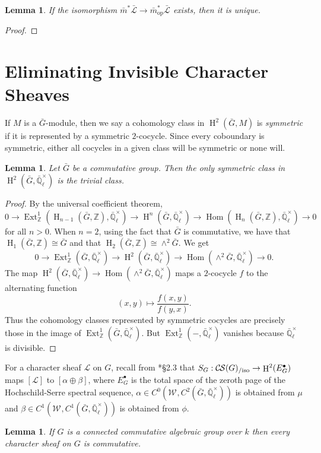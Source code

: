 \documentclass[10pt]{amsart}
\theoremstyle{plain}
\newtheorem{lemma}[theorem]{Lemma}
\theoremstyle{definition}
\newcommand{\ZZ}{{\mathbb{Z}}}
\newcommand{\EE}{\mathbb{\bar Q}_\ell}
\newcommand{\Fq}{k}
\newcommand{\EEx}{\EE^\times}
\newcommand{\Weil}[1]{\mathcal{W}_{#1}}
\DeclareMathOperator{\Hom}{Hom}
\DeclareMathOperator{\Ext}{Ext}
\DeclareMathOperator{\Hh}{H}
\newcommand{\op}{_{\operatorname{op}}}
\newcommand{\cs}[1]{{\mathcal{#1}}}
\newcommand{\gcs}[1]{{\mathcal{\bar #1}}}
\newcommand{\CS}{{\mathcal{C\hskip-0.8pt S}}}
\newcommand{\CSiso}[1]{\CS(#1)_{/\text{iso}}}
\newcommand{\bG}{\bar{G}}
\begin{document}
\begin{lemma}
If the isomorphism ${\bar m}^* \gcs{L} \to {\bar m}\op^* \gcs{L}$ exists, then it is unique.
\end{lemma}
\begin{proof}
\end{proof}

\section{Eliminating Invisible Character Sheaves}

If $M$ is a $\bG$-module, then we say a cohomology class in $\Hh^2(\bG, M)$ is \emph{symmetric} if it is represented
by a symmetric $2$-cocycle.  Since every coboundary is symmetric, either all cocycles in a given class will be symmetric
or none will.

\begin{lemma} \label{lem:symtriv}
Let $\bG$ be a commutative group.  Then the only symmetric class in $\Hh^2(\bG, \EEx)$ is the trivial class.
\end{lemma}

\begin{proof}
By the universal coefficient theorem,
\[
0 \to \Ext^1_\ZZ(\Hh_{n-1}(\bG, \ZZ), \EEx) \to \Hh^n(\bG, \EEx) \to \Hom(\Hh_n(\bG, \ZZ), \EEx) \to 0
\]
for all $n > 0$.  When $n = 2$, using the fact that $\bG$ is commutative, we have that $\Hh_1(\bG, \ZZ) \cong \bG$
and that $\Hh_2(\bG, \ZZ) \cong \wedge^2 \bG$. We get
\[
0 \to \Ext^1_\ZZ(\bG, \EEx) \to \Hh^2(\bG, \EEx) \to \Hom(\wedge^2 \bG, \EEx) \to 0.
\]
The map $\Hh^2(\bG, \EEx) \to \Hom(\wedge^2 \bG, \EEx)$ maps a $2$-cocycle $f$ to the alternating function
\[
(x,y) \mapsto \frac{f(x,y)}{f(y,x)}.
\]
Thus the cohomology classes represented by symmetric cocycles are precisely those in the image of $\Ext^1_\ZZ(\bG, \EEx)$.
But $\Ext^1_\ZZ(-, \EEx)$ vanishes because $\EEx$ is divisible.
\end{proof}

For a character sheaf $\cs{L}$ on $G$, recall from \cite{cunningham-roe:13a}*{\S 2.3} that $S_G : \CSiso{G} \to \Hh^2(E_G^\bullet)$ maps
$[\cs{L}]$ to $[\alpha \oplus \beta]$, where $E_G^\bullet$ is the total space of the zeroth page
of the Hochschild-Serre spectral sequence, $\alpha \in C^0(\Weil{}, C^2(\bG, \EEx))$ is obtained from $\mu$ and
$\beta \in C^1(\Weil{}, C^1(\bG, \EEx))$ is obtained from $\phi$.

\begin{lemma} \label{lem:conncomm}
If $G$ is a connected commutative algebraic group over $\Fq$ then every character sheaf on $G$ is commutative.
\end{lemma}
\end{document}
